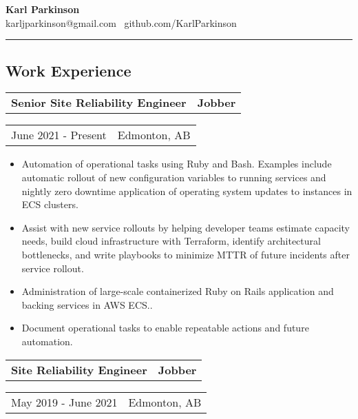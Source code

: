 \documentclass[10pt,letterpaper]{article}
\makeatletter
\newcommand{\headerrow}[2]
{\begin{tabular*}{\linewidth}{l@{\extracolsep{\fill}}r}
	#1 &
	#2 \\
\end{tabular*}}
\makeatother
\begin{document}
\begin{center}
{\LARGE \textbf{Karl Parkinson}}
\\
karljparkinson@gmail.com \textbullet \ github.com/KarlParkinson

\end{center}

\hrule

\subsection*{Work Experience}
       \headerrow
       	        {\textbf{Senior Site Reliability Engineer}}
	        {\textbf{Jobber}}
	\headerrow
		{June 2021 - Present}
		{Edmonton, AB}
		
       \begin{itemize}
          \itemsep0em
                \item Automation of operational tasks using Ruby and Bash. Examples include automatic rollout of new configuration variables to running services and nightly zero downtime application of operating system updates to instances in ECS clusters.
                \item Assist with new service rollouts by helping developer teams estimate capacity needs, build cloud infrastructure with Terraform, identify architectural bottlenecks, and write playbooks to minimize MTTR of future incidents after service rollout.
                \item Administration of large-scale containerized Ruby on Rails application and backing services in AWS ECS..
                \item Document operational tasks to enable repeatable actions and future automation.
        \end{itemize}
       \headerrow
       	        {\textbf{Site Reliability Engineer}}
	        {\textbf{Jobber}}
	\headerrow
		{May 2019 - June 2021}
		{Edmonton, AB}
		
\end{document}
